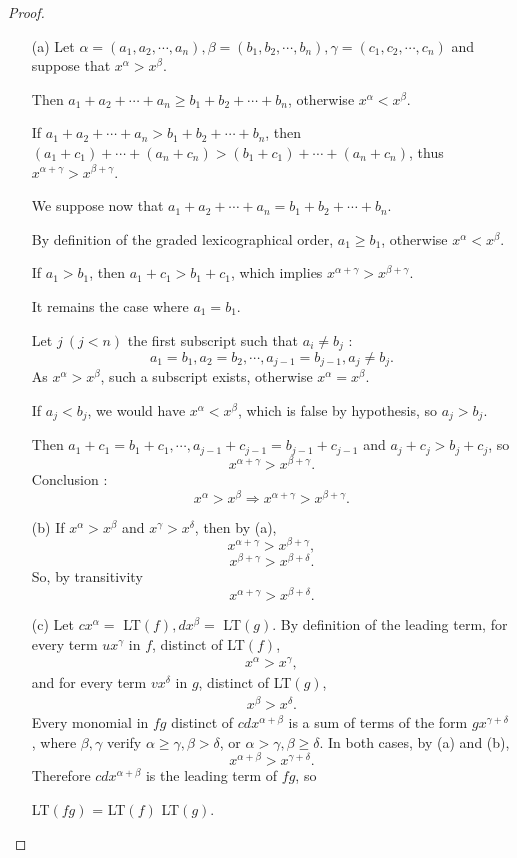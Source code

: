 \documentclass[11pt,a4paper]{article}
\begin{document}
\begin{proof}
\begin{enumerate}
\item[(a)]
Let $\alpha = (a_1,a_2,\cdots, a_n),\beta = (b_1,b_2,\cdots,b_n),\gamma = (c_1,c_2,\cdots, c_n)$ and suppose that $x^{\alpha}>x^{\beta}$.

Then $a_1+a_2+\cdots+a_n \geq b_1+b_2+\cdots+b_n$, otherwise $x^{\alpha}<x^{\beta}$.

If $a_1+a_2+\cdots+a_n > b_1+b_2+\cdots+b_n$, then $(a_1+c_1)+ \cdots+(a_n+c_n) > (b_1 + c_1)+\cdots + (a_n+c_n)$, thus $x^{\alpha+\gamma}>x^{\beta+\gamma}$.

We suppose now that $a_1+a_2+\cdots+a_n = b_1+b_2+\cdots+b_n$.

By definition of the graded lexicographical order, $a_1 \geq b_1$, otherwise $x^{\alpha}<x^{\beta}$. 

If $a_1>b_1$, then $a_1+c_1>b_1+c_1$, which implies $x^{\alpha+\gamma}>x^{\beta+\gamma}$.


It remains the case where $a_1=b_1$.

Let $j\ (j<n)$ the first subscript such that $a_i \neq b_j$ : $$a_1=b_1,a_2=b_2,\cdots,a_{j-1}=b_{j-1}, a_j\neq b_j.$$
As $x^{\alpha}>x^{\beta}$, such a subscript exists, otherwise $x^{\alpha}=x^{\beta}$.

If $a_j < b_j$, we would have $x^{\alpha}<x^{\beta}$, which is false by hypothesis, so $a_j > b_j$.

Then $a_1 +c_1 = b_1+c_1, \cdots, a_{j-1}+c_{j-1} = b_{j-1} + c_{j-1}$ and $a_j + c_j > b_j + c_j$, so 
$$x^{\alpha+\gamma}>x^{\beta+\gamma}.$$
Conclusion : $$x^{\alpha} > x^{\beta} \Rightarrow x^{\alpha+\gamma}>x^{\beta+\gamma}.$$

\item[(b)]
If $x^{\alpha}> x^{\beta}$ and $x^{\gamma} > x^{\delta}$, then by  (a), 
$$x^{\alpha+\gamma}> x^{\beta+\gamma},$$
$$x^{\beta+\gamma}>x^{\beta+\delta}.$$
So, by transitivity
$$x^{\alpha+\gamma}>x^{\beta+\delta}.$$

\item[(c)]
Let $c x^{\alpha} = $ { \scriptsize LT}$(f), d x^{\beta} = $ {  \scriptsize LT}$(g)$.
By definition of the leading term, for every term $ux^\gamma$ in $f$, distinct of {\scriptsize LT}$(f)$,
\begin{align*}
x^{\alpha}> x^{\gamma},
\end{align*}
and for every term $vx^\delta$ in $g$, distinct of {\scriptsize LT}$(g)$,
\begin{align*}
x^{\beta} > x^{\delta}.
\end{align*}
Every monomial in $fg$ distinct of $cd x^{\alpha+\beta}$ is a sum of terms of the form $gx^{\gamma+ \delta}$, where $\beta,\gamma$ verify $\alpha \geq \gamma, \beta > \delta$, or $\alpha>\gamma, \beta \geq \delta$. In both cases, by (a) and (b),
$$x^{\alpha+\beta}>x^{\gamma+\delta}.$$
Therefore $cd x^{\alpha+\beta}$ is the leading term of $fg$, so
\begin{center}
{ \scriptsize LT}$(fg)$ = { \scriptsize LT}$(f)${ \scriptsize LT}$(g)$.
\end{center}
\end{enumerate}
\end{proof}
\end{document}
